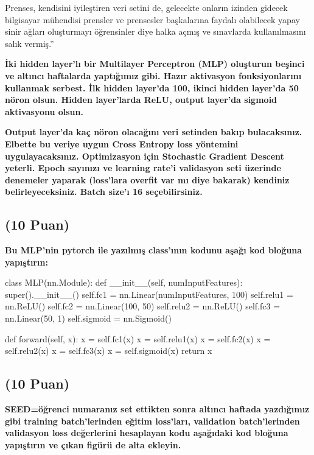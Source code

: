 \documentclass[11pt]{article}
\begin{document}
Prenses, kendisini iyileştiren veri setini de, gelecekte onların izinden gidecek bilgisayar mühendisi prensler ve prensesler başkalarına faydalı olabilecek yapay sinir ağları oluşturmayı öğrensinler diye halka açmış ve sınavlarda kullanılmasını salık vermiş.''

\textbf{İki hidden layer'lı bir Multilayer Perceptron (MLP) oluşturun beşinci ve altıncı haftalarda yaptığımız gibi. Hazır aktivasyon fonksiyonlarını kullanmak serbest. İlk hidden layer'da 100, ikinci hidden layer'da 50 nöron olsun. Hidden layer'larda ReLU, output layer'da sigmoid aktivasyonu olsun.}

\textbf{Output layer'da kaç nöron olacağını veri setinden bakıp bulacaksınız. Elbette bu veriye uygun Cross Entropy loss yöntemini uygulayacaksınız. Optimizasyon için Stochastic Gradient Descent yeterli. Epoch sayınızı ve learning rate'i validasyon seti üzerinde denemeler yaparak (loss'lara overfit var mı diye bakarak) kendiniz belirleyeceksiniz. Batch size'ı 16 seçebilirsiniz.}

\subsection{(10 Puan)} \textbf{Bu MLP'nin pytorch ile yazılmış class'ının kodunu aşağı kod bloğuna yapıştırın:}

\begin{python}
class MLP(nn.Module):
    def __init__(self, numInputFeatures):
        super().__init__()
        self.fc1 = nn.Linear(numInputFeatures, 100) 
        self.relu1 = nn.ReLU() 
        self.fc2 = nn.Linear(100, 50) 
        self.relu2 = nn.ReLU() 
        self.fc3 = nn.Linear(50, 1) 
        self.sigmoid = nn.Sigmoid() 
        
    def forward(self, x):
        x = self.fc1(x)
        x = self.relu1(x)
        x = self.fc2(x)
        x = self.relu2(x)
        x = self.fc3(x)
        x = self.sigmoid(x)
        return x
\end{python}

\subsection{(10 Puan)} \textbf{SEED=öğrenci numaranız set ettikten sonra altıncı haftada yazdığımız gibi training batch'lerinden eğitim loss'ları, validation batch'lerinden validasyon loss değerlerini hesaplayan kodu aşağıdaki kod bloğuna yapıştırın ve çıkan figürü de alta ekleyin.}
\end{document}
